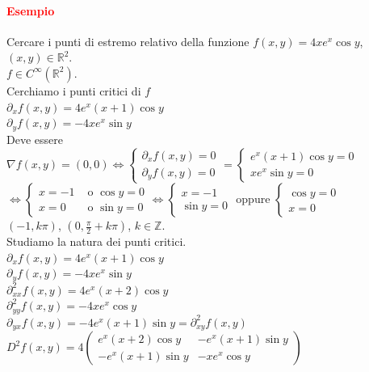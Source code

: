\documentclass{article}
\newcommand{\R}{\mathbb{R}}
\newcommand{\Z}{\mathbb{Z}}
\begin{document}
\paragraph{\textcolor{red}{Esempio}}
Cercare i punti di estremo relativo della funzione $f(x,y)=4xe^x\cos y$, $(x,y)\in\R^2$.\\
$f \in C^\infty(\R^2)$.\\
Cerchiamo i punti critici di $f$ \\
$\partial_xf(x,y)=4e^x(x+1)\cos y$\\
$\partial_yf(x,y)=-4xe^x\sin y$\\
Deve essere $\nabla f(x,y)=(0,0)\Leftrightarrow \begin{cases}
    \partial_x f(x,y)=0\\
    \partial_y f(x,y)=0
\end{cases}= \begin{cases}
    e^x(x+1)\cos y=0\\
    xe^x\sin y=0
\end{cases}$\\
$\Leftrightarrow \begin{cases}
    x=-1 &\text{  o  }\cos y =0\\
    x=0 &\text{  o  }\sin y=0
\end{cases} \Leftrightarrow \begin{cases}
    x=-1\\
    \sin y =0
\end{cases}$ oppure $\begin{cases}
    \cos y=0\\
    x=0
\end{cases}$\\
$(-1,k\pi)$, $(0,\frac{\pi}{2}+k\pi)$, $k \in \Z$.\\
Studiamo la natura dei punti critici.\\
$\partial_xf(x,y)=4e^x(x+1)\cos y$\\
$\partial_yf(x,y)=-4xe^x\sin y$\\
$\partial_{xx}^2f(x,y)=4e^x(x+2)\cos y$\\
$\partial_{yy}^2f(x,y)=-4xe^x \cos y$\\
$\partial_{yx}f(x,y)=-4e^x(x+1)\sin y= \partial_{xy}^2f(x,y)$\\
$D^2f(x,y)=4 \begin{pmatrix}
    e^x(x+2)\cos y & -e^x(x+1)\sin y\\
    -e^x(x+1)\sin y & -x e^x \cos y
\end{pmatrix}$\\
\end{document}
